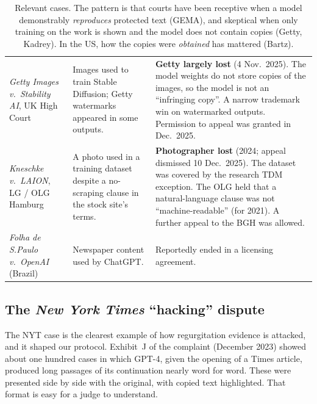 \documentclass[10pt,a4paper]{article}
\begin{document}
\begin{table}[h]
\begin{tabularx}{\linewidth}{>{\raggedright\arraybackslash}p{2.6cm}>{\raggedright\arraybackslash}X>{\raggedright\arraybackslash}X}
\emph{Getty Images v.\ Stability AI}, UK High Court &
Images used to train Stable Diffusion; Getty watermarks appeared in some outputs. &
\textbf{Getty largely lost} (4 Nov.\ 2025). The model weights do not store copies of the images, so the model is not
an ``infringing copy''. A narrow trademark win on watermarked outputs. Permission to appeal was granted in Dec.\ 2025.\\
\emph{Kneschke v.\ LAION}, LG / OLG Hamburg &
A photo used in a training dataset despite a no-scraping clause in the stock site's terms. &
\textbf{Photographer lost} (2024; appeal dismissed 10 Dec.\ 2025). The dataset was covered by the research TDM
exception. The OLG held that a natural-language clause was not ``machine-readable'' (for 2021). A further appeal to
the BGH was allowed.\\
\emph{Folha de S.Paulo v.\ OpenAI} (Brazil) & Newspaper content used by ChatGPT. & Reportedly ended in a licensing
agreement.\\
\bottomrule
\end{tabularx}
\caption{Relevant cases. The pattern is that courts have been receptive when a model demonstrably
\emph{reproduces} protected text (GEMA), and skeptical when only training on the work is shown and the model does not
contain copies (Getty, Kadrey). In the US, how the copies were \emph{obtained} has mattered (Bartz).}
\label{tab:cases}
\end{table}

\subsection{The \emph{New York Times} ``hacking'' dispute}\label{sec:nyt}
The NYT case is the clearest example of how regurgitation evidence is attacked, and it shaped our protocol. Exhibit~J
of the complaint (December 2023) showed about one hundred cases in which GPT-4, given the opening of a Times article,
produced long passages of its continuation nearly word for word. These were presented side by side with the
original, with copied text highlighted. That format is easy for a judge to understand.
\end{document}
